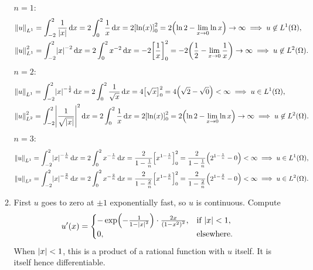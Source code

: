 \documentclass[english]{exercise}
\begin{document}
\begin{enumerate}
\begin{enumerate}
			\(n = 1\):
			\begin{align*}
				\norm*{u}_{L^1} &= \int_{-2}^2 \frac{1}{\absolute*{x}}\d x = 2\int_0^2 \frac{1}{x}\d x = 2\brackets*{\ln\parentheses*{x}}_0^2 = 2\parentheses*{\ln 2 - \lim_{x \to 0}\ln x} \to \infty \implies u \not\in L^1\parentheses*{\Omega},\\
				\norm*{u}_{L^1}^2 &= \int_{-2}^2 \absolute*{x}^{-2}\d x = 2\int_0^2 x^{-2}\d x = -2\brackets*{\frac{1}{x}}_0^2 = -2\parentheses*{\frac{1}{2} - \lim_{x \to 0}\frac{1}{x}} \to \infty \implies u \not\in L^2\parentheses*{\Omega}.
			\end{align*}
			\(n = 2\):
			\begin{align*}
				\norm*{u}_{L^1} &= \int_{-2}^2 \absolute*{x}^{-\frac{1}{2}}\d x = 2\int_0^2 \frac{1}{\sqrt{x}}\d x = 4\brackets*{\sqrt{x}}_0^2 = 4\parentheses*{\sqrt{2} - \sqrt{0}} < \infty \implies u \in L^1\parentheses*{\Omega},\\
				\norm*{u}_{L^2}^2 &= \int_{-2}^2 \absolute*{\frac{1}{\sqrt{\absolute*{x}}}}^2\d x = 2\int_0^2 \frac{1}{x}\d x = 2\brackets*{\ln\parentheses*{x}}_0^2 = 2\parentheses*{\ln 2 - \lim_{x \to 0}\ln x} \to \infty \implies u \not\in L^2\parentheses*{\Omega}.
			\end{align*}
			\(n = 3\):
			\begin{align*}
				\norm*{u}_{L^1} = \int_{-2}^2 \absolute*{x}^{-\frac{1}{n}}\d x = 2\int_0^2 x^{-\frac{1}{n}}\d x = \frac{2}{1 - \frac{1}{n}}\brackets*{x^{1 - \frac{1}{n}}}_0^2 = \frac{2}{1 - \frac{1}{n}}\parentheses*{2^{1 - \frac{1}{n}} - 0} < \infty \implies u \in L^1\parentheses*{\Omega},\\
				\norm*{u}_{L^2} = \int_{-2}^2 \absolute*{x}^{-\frac{2}{n}}\d x = 2\int_0^2 x^{-\frac{2}{n}}\d x = \frac{2}{1 - \frac{2}{n}}\brackets*{x^{1 - \frac{2}{n}}}_0^2 = \frac{2}{1 - \frac{2}{n}}\parentheses*{2^{1 - \frac{2}{n}} - 0} < \infty \implies u \in L^2\parentheses*{\Omega}.
			\end{align*}
			\item First \(u\) goes to zero at \(\pm 1\) exponentially fast, so \(u\) is continuous.
			Compute
			\[
				u'\parentheses*{x} = \begin{cases}
					-\exp\parentheses*{-\frac{1}{1 - \absolute*{x}^2}} \cdot \frac{2x}{\parentheses*{1 - x^2}^2}, & \text{if }\absolute*{x} < 1,\\
					0, & \text{elsewhere}.
				\end{cases}
			\]
			When \(\absolute*{x} < 1\), this is a product of a rational function with \(u\) itself.
			It is itself hence differentiable.

\end{enumerate}
\end{enumerate}
\end{document}
